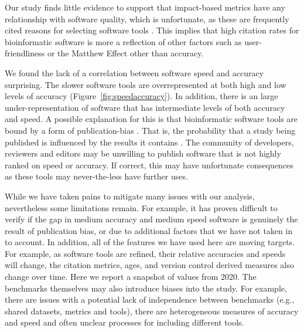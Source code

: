 \documentclass[fleqn,10pt]{SelfArx} %
\begin{document}
Our study finds little evidence to support that impact-based metrics
have any relationship with software quality, which is unfortunate, as these
are frequently cited reasons for selecting software tools
\cite{Loman2015-bw}. This implies that high citation
rates for bioinformatic software
\cite{Perez-Iratxeta2007-lv,Van_Noorden2014-kc,Wren2016-xy} is more a
reflection of other factors such as user-friendliness or the Matthew Effect
\cite{Lariviere2010-kx,Merton1968-cb} other than accuracy.

We found the lack of a correlation between software speed and accuracy
surprising.  The slower software tools are overrepresented at both
high and low levels of accuracy (Figure~\ref{fig:speedaccuracy}).
In addition, there is an large under-representation of software that has
intermediate levels of both accuracy and speed. A possible explanation
for this is that bioinformatic software tools are bound by a form of
publication-bias \cite{Boulesteix2015-am,Nissen:2016}. That is, the
probability that a study being published is influenced by the results
it contains \cite{sterling1995publication}. The community of
developers, reviewers and editors may be unwilling to publish software
that is not highly ranked on speed or accuracy. If correct, this may
have unfortunate consequences as these tools may never-the-less have further uses.


While we have taken pains to mitigate many issues with our analysis, nevertheless 
some limitations remain. For example, it has proven difficult to verify if the gap in medium accuracy 
and medium speed software is genuinely the result of publication bias, or due to additional factors that we have 
not taken in to account. In addition, all of the features we have used here are moving targets. For example, as software 
tools are refined, their relative accuracies and speeds will change, the citation metrics, ages, and version control 
derived measures also change over time. Here we report a snapshot of values from 2020.  The benchmarks themselves may 
also introduce biases into the study. For example, there are issues with a potential lack of independence between benchmarks 
(e.g., shared datasets, metrics and tools), there are heterogeneous measures of accuracy and speed and often unclear 
processes for including different tools. 
\end{document}
